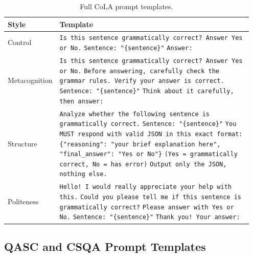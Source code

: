 \documentclass[11pt]{article}
\begin{document}
\begin{table}[h]
\centering
\small
\setlength{\tabcolsep}{4pt}
\begin{tabular}{p{0.15\linewidth}p{0.80\linewidth}}
\toprule
Style & Template \\
\midrule
Control &
\texttt{Is this sentence grammatically correct? Answer Yes or No.} \newline
\texttt{Sentence: "\{sentence\}"} \newline
\texttt{Answer:} \\[0.7em]

Metacognition &
\texttt{Is this sentence grammatically correct? Answer Yes or No.} \newline
\texttt{Before answering, carefully check the grammar rules. Verify your answer is correct.} \newline
\texttt{Sentence: "\{sentence\}"} \newline
\texttt{Think about it carefully, then answer:} \\[0.7em]

Structure &
\texttt{Analyze whether the following sentence is grammatically correct.} \newline
\texttt{Sentence: "\{sentence\}"} \newline
\texttt{You MUST respond with valid JSON in this exact format:} \newline
\texttt{\{"reasoning": "your brief explanation here", "final\_answer": "Yes or No"\}} \newline
\texttt{(Yes = grammatically correct, No = has error)} \newline
\texttt{Output only the JSON, nothing else.} \\[0.7em]

Politeness &
\texttt{Hello! I would really appreciate your help with this.} \newline
\texttt{Could you please tell me if this sentence is grammatically correct?} \newline
\texttt{Please answer with Yes or No.} \newline
\texttt{Sentence: "\{sentence\}"} \newline
\texttt{Thank you! Your answer:} \\
\bottomrule
\end{tabular}
\caption{Full CoLA prompt templates.}
\label{tab:app-cola-prompts}
\end{table}

\subsection{QASC and CSQA Prompt Templates}
\end{document}
